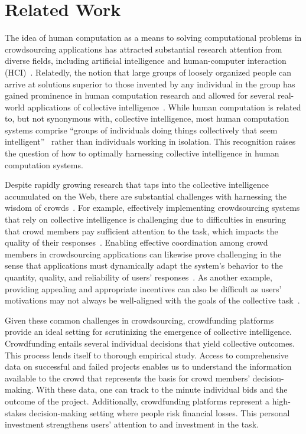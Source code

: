 \documentclass[sigconf]{acmart}
\begin{document}
\section{Related Work}
The idea of human computation as a means to solving computational problems in crowdsourcing applications has attracted substantial research attention from diverse fields, including artificial intelligence and human-computer interaction (HCI)~\cite{quinn2011human}. Relatedly, the notion that large groups of loosely organized people can arrive at solutions superior to those invented by any individual in the group has gained prominence in human computation research and allowed for several real-world applications of collective intelligence~\cite{malone2010collective}. While human computation is related to, but not synonymous with, collective intelligence, most human computation systems comprise ``groups of individuals doing things collectively that seem intelligent''~\cite{malone2010collective} rather than individuals working in isolation. This recognition raises the question of how to optimally harnessing collective intelligence in human computation systems.

Despite rapidly growing research that taps into the collective intelligence accumulated on the Web, there are substantial challenges with harnessing the wisdom of crowds~\cite{ipeirotis2014quizz,qiu2020improving,krivosheev2020active,bozzon2013reactive,dow2012shepherding}. For example, effectively implementing crowdsourcing systems that rely on collective intelligence is challenging due to difficulties in ensuring that crowd members pay sufficient attention to the task, which impacts the quality of their responses~\cite{ipeirotis2014quizz,qiu2020improving}. Enabling effective coordination among crowd members in crowdsourcing applications can likewise prove challenging in the sense that applications must dynamically adapt the system's behavior to the quantity, quality, and reliability of users' responses~\cite{bozzon2013reactive}. As another example, providing appealing and appropriate incentives can also be difficult as users' motivations may not always be well-aligned with the goals of the collective task~\cite{ipeirotis2014quizz}.

Given these common challenges in crowdsourcing, crowdfunding platforms provide an ideal setting for scrutinizing the emergence of collective intelligence. Crowdfunding entails several individual decisions that yield collective outcomes. This process lends itself to thorough empirical study. Access to comprehensive data on successful and failed projects enables us to understand the information available to the crowd that represents the basis for crowd members' decision-making. With these data, one can track to the minute individual bids  and the outcome of the project. Additionally, crowdfunding platforms represent a high-stakes decision-making setting where people risk financial losses. This personal investment strengthens users' attention to and investment in the task.
\end{document}
